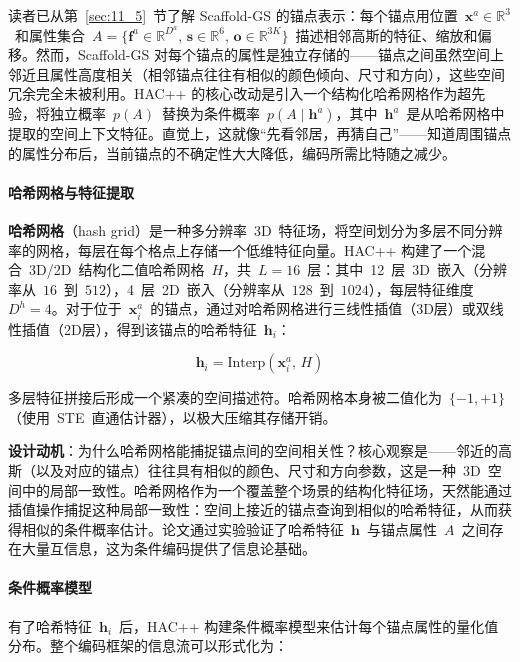 读者已从第~\ref{sec:11_5}~节了解 Scaffold-GS 的锚点表示：每个锚点用位置~$\mathbf{x}^a \in \mathbb{R}^3$~和属性集合~$A = \{\mathbf{f}^a \in \mathbb{R}^{D^a},\, \mathbf{s} \in \mathbb{R}^6,\, \mathbf{o} \in \mathbb{R}^{3K}\}$~描述相邻高斯的特征、缩放和偏移。然而，Scaffold-GS 对每个锚点的属性是独立存储的——锚点之间虽然空间上邻近且属性高度相关（相邻锚点往往有相似的颜色倾向、尺寸和方向），这些空间冗余完全未被利用。HAC++ 的核心改动是引入一个结构化哈希网格作为超先验，将独立概率~$p(A)$~替换为条件概率~$p(A \mid \mathbf{h}^a)$，其中~$\mathbf{h}^a$~是从哈希网格中提取的空间上下文特征。直觉上，这就像``先看邻居，再猜自己''——知道周围锚点的属性分布后，当前锚点的不确定性大大降低，编码所需比特随之减少。

\paragraph{哈希网格与特征提取}

\textbf{哈希网格}（hash grid）是一种多分辨率~3D~特征场，将空间划分为多层不同分辨率的网格，每层在每个格点上存储一个低维特征向量。HAC++ 构建了一个混合~3D/2D~结构化二值哈希网格~$H$，共~$L=16$~层：其中~12~层~3D~嵌入（分辨率从~$16$~到~$512$），4~层~2D~嵌入（分辨率从~$128$~到~$1024$），每层特征维度~$D^h=4$。对于位于~$\mathbf{x}_i^a$~的锚点，通过对哈希网格进行三线性插值（3D层）或双线性插值（2D层），得到该锚点的哈希特征~$\mathbf{h}_i$：

\begin{equation}
\mathbf{h}_i = \text{Interp}(\mathbf{x}_i^a,\, H)
\end{equation}

多层特征拼接后形成一个紧凑的空间描述符。哈希网格本身被二值化为~$\{-1, +1\}$（使用~STE~直通估计器），以极大压缩其存储开销。

\textbf{设计动机}：为什么哈希网格能捕捉锚点间的空间相关性？核心观察是——邻近的高斯（以及对应的锚点）往往具有相似的颜色、尺寸和方向参数，这是一种~3D~空间中的局部一致性。哈希网格作为一个覆盖整个场景的结构化特征场，天然能通过插值操作捕捉这种局部一致性：空间上接近的锚点查询到相似的哈希特征，从而获得相似的条件概率估计。论文通过实验验证了哈希特征~$\mathbf{h}$~与锚点属性~$A$~之间存在大量互信息，这为条件编码提供了信息论基础。

\paragraph{条件概率模型}

有了哈希特征~$\mathbf{h}_i$~后，HAC++ 构建条件概率模型来估计每个锚点属性的量化值分布。整个编码框架的信息流可以形式化为：

